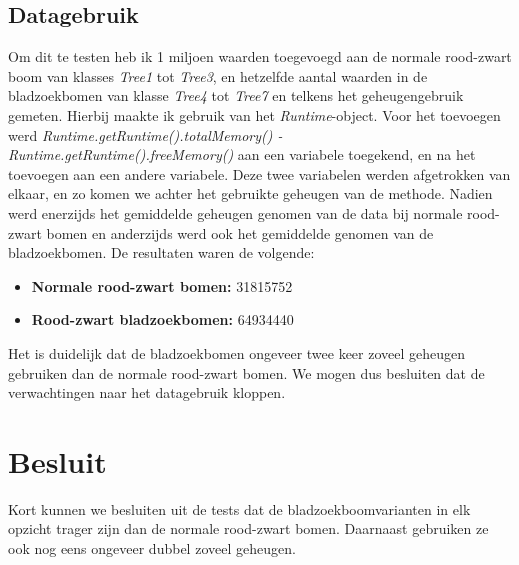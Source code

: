\documentclass[11pt,a4paper]{report}
\begin{document}
\subsection{Datagebruik}
Om dit te testen heb ik 1 miljoen waarden toegevoegd aan de normale rood-zwart boom van klasses \textsl{Tree1} tot \textsl{Tree3}, en hetzelfde aantal waarden in de bladzoekbomen van klasse \textsl{Tree4} tot \textsl{Tree7} en telkens het geheugengebruik gemeten. Hierbij maakte ik gebruik van het \textsl{Runtime}-object. Voor het toevoegen werd \textsl{Runtime.getRuntime().totalMemory() - Runtime.getRuntime().freeMemory()} aan een variabele toegekend, en na het toevoegen aan een andere variabele. Deze twee variabelen werden afgetrokken van elkaar, en zo komen we achter het gebruikte geheugen van de methode. Nadien werd enerzijds het gemiddelde geheugen genomen van de data bij normale rood-zwart bomen en anderzijds werd ook het gemiddelde genomen van de bladzoekbomen. De resultaten waren de volgende:
\begin{itemize}
\item \textbf{Normale rood-zwart bomen:} 31815752\\
\item \textbf{Rood-zwart bladzoekbomen:} 64934440\\
\end{itemize}
Het is duidelijk dat de bladzoekbomen ongeveer twee keer zoveel geheugen gebruiken dan de normale rood-zwart bomen. We mogen dus besluiten dat de verwachtingen naar het datagebruik kloppen.

\section{Besluit}
Kort kunnen we besluiten uit de tests dat de bladzoekboomvarianten in elk opzicht trager zijn dan de normale rood-zwart bomen. Daarnaast gebruiken ze ook nog eens ongeveer dubbel zoveel geheugen.
\end{document}
